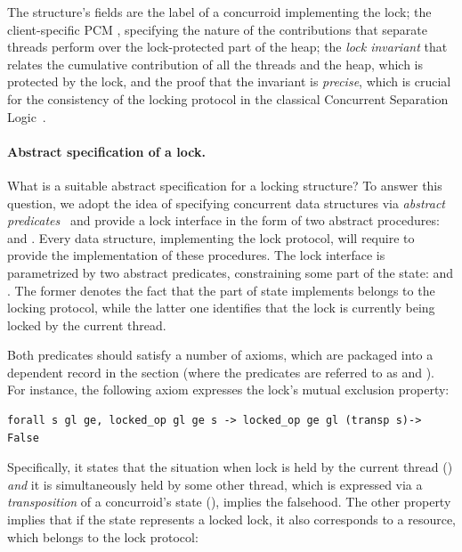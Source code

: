 The structure's fields are the label  of a concurroid
implementing the lock; the client-specific PCM ,
specifying the nature of the contributions that separate threads
perform over the lock-protected part of the heap; the \emph{lock
  invariant}  that relates the cumulative contribution of
all the threads and the heap, which is protected by the lock, and the
proof  that the invariant is \emph{precise}, which is
crucial for the consistency of the locking protocol in the classical
Concurrent Separation Logic~\cite{OHearn:TCS07}.
%

\paragraph{Abstract specification of a lock.~~}

What is a suitable abstract specification for a locking structure? To
answer this question, we adopt the idea of specifying concurrent data
structures via \emph{abstract
  predicates}~\cite{DinsdaleYoung-al:ECOOP10} and provide a lock
interface in the form of two abstract procedures:  and
. Every data structure, implementing the lock protocol,
will require to provide the implementation of these procedures. The
lock interface is parametrized by two abstract predicates,
constraining some part of the state:  and
. The former denotes the fact that the part of state
implements belongs to the locking protocol, while the latter one
identifies that the lock is currently being locked by the current
thread.

Both predicates should satisfy a number of axioms, which are packaged
into a dependent record in the section  (where the
predicates are referred to as  and ).
For instance, the following axiom expresses the lock's mutual
exclusion property:

\begin{lstlisting}
forall s gl ge, locked_op gl ge s -> locked_op ge gl (transp s)-> False  
\end{lstlisting}

Specifically, it states that the situation when lock is held by the current
thread () \emph{and} it is simultaneously held
by some other thread, which is expressed via a \emph{transposition} of
a concurroid's state  (),
implies the falsehood. The other property implies that if the state
represents a locked lock, it also corresponds to a resource, which
belongs to the lock protocol:

